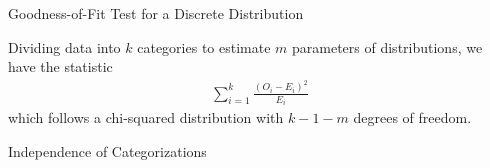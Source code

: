\begin{frame}{Goodness-of-Fit Test for a Discrete Distribution}

\justifying
{} Dividing data into $k$ categories to estimate $m$ parameters of distributions, we have the statistic
\begin{align*}
\sum_{i=1}^k \frac{(O_i - E_i)^2}{E_i}
\end{align*}
which follows a chi-squared distribution with $k-1-m$ degrees of freedom.

\end{frame}

\begin{frame}{Independence of Categorizations}



\end{frame}

